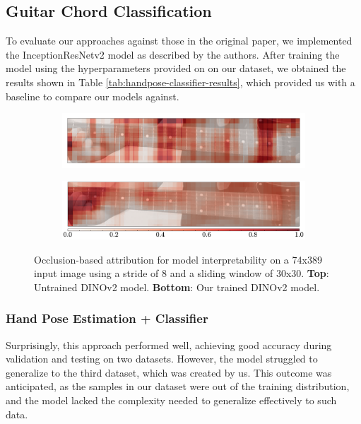 \documentclass[10pt,twocolumn,letterpaper]{article}
\begin{document}
\subsection{Guitar Chord Classification}
To evaluate our approaches against those in the original paper, we implemented the InceptionResNetv2 model as described by the authors. After training the model using the hyperparameters provided on \cite{Kristian_Zaman_Tenoyo_Jodhinata_2024} on our dataset, we obtained the results shown in Table \ref{tab:handpose-classifier-results}, which provided us with a baseline to compare our models against.

\begin{figure}[h]
    \centering
    \begin{subfigure}[t]{0.5\textwidth}
        \centering
        \includegraphics[width=\textwidth]{images/final/occlusion_untrained.pdf}
    \end{subfigure}
    \begin{subfigure}[t]{0.5\textwidth}
        \centering
        \includegraphics[width=\textwidth]{images/final/occlusion_trained.pdf}
    \end{subfigure}
    \caption{Occlusion-based attribution for model interpretability on a 74x389 input image using a stride of 8 and a sliding window of 30x30. \textbf{Top}: Untrained DINOv2 model. \textbf{Bottom}: Our trained DINOv2 model.}
    \label{fig:chord-classifier-visualization-fretboard}
\end{figure}

\subsubsection{Hand Pose Estimation + Classifier}
Surprisingly, this approach performed well, achieving good accuracy during validation and testing on two datasets. However, the model struggled to generalize to the third dataset, which was created by us. This outcome was anticipated, as the samples in our dataset were out of the training distribution, and the model lacked the complexity needed to generalize effectively to such data.
\end{document}
